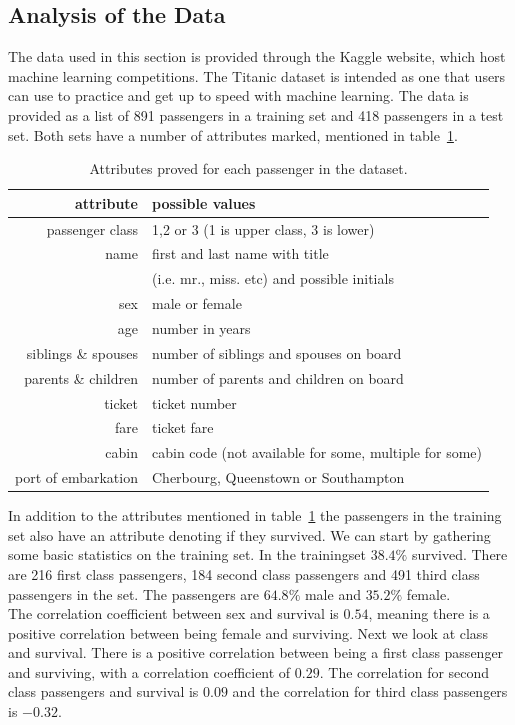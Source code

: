 \documentclass{llncs}
\begin{document}
\subsection{Analysis of the Data}
The data used in this section is provided through the Kaggle website, which host machine learning competitions. The Titanic dataset is intended as one that users can use to practice and get up to speed with machine learning. The data is provided as a list of 891 passengers in a training set and 418 passengers in a test set. Both sets have a number of attributes marked, mentioned in table~\ref{tab:passenger_attributes}.
\begin{table}[H]
\caption{Attributes proved for each passenger in the dataset.}
\label{tab:passenger_attributes}
\centering
\begin{tabular}{ r | l }
  attribute & possible values \\ \hline \hline
  passenger class & 1,2 or 3 (1 is upper class, 3 is lower)  \\
  name & first and last name with title \\
  & (i.e. mr., miss. etc) and possible initials  \\
  sex & male or female \\
  age & number in years \\
  siblings \& spouses & number of siblings and spouses on board \\
  parents \& children & number of parents and children on board \\
  ticket & ticket number \\
  fare & ticket fare \\
  cabin & cabin code (not available for some, multiple for some)\\
  port of embarkation & Cherbourg, Queenstown or Southampton

\end{tabular}
\end{table}
In addition to the attributes mentioned in table~\ref{tab:passenger_attributes} the passengers in the training set also have an attribute denoting if they survived.  We can start by gathering some basic statistics on the training set. In the trainingset $38.4\%$ survived. There are 216 first class passengers, 184 second class passengers and 491 third class passengers in the set. The passengers are $64.8\%$ male and $35.2\%$ female.\\
The correlation coefficient between sex and survival is $0.54$, meaning there is a positive correlation between being female and surviving. Next we look at class and survival. There is a positive correlation between being a first class passenger and surviving, with a correlation coefficient of $0.29$. The correlation for second class passengers and survival is $0.09$ and the correlation for third class passengers is $-0.32$.\\
\end{document}
